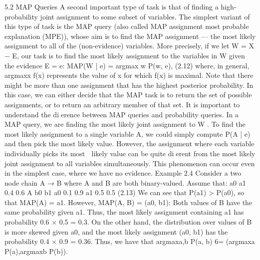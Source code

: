 5.2 MAP Queries
A second important type of task is that of finding a high-probability joint assignment to some subset of variables. The simplest variant of this type of task is the MAP query (also called MAP assignment most probable explanation (MPE)), whose aim is to find the MAP assignment — the most likely assignment to all of the (non-evidence) variables. More precisely, if we let W = X − E, our task is to find the most likely assignment to the variables in W given the evidence E = e: MAP(W | e) = argmax w P(w, e), (2.12) where, in general, argmaxx f(x) represents the value of x for which f(x) is maximal. Note that there might be more than one assignment that has the highest posterior probability. In this case, we can either decide that the MAP task is to return the set of possible assignments, or to return an arbitrary member of that set. It is important to understand the dierence between MAP queries and probability queries. In a MAP query, we are finding the most likely joint assignment to W . To find the most likely assignment to a single variable A, we could simply compute P(A | e) and then pick the most likely value. However, the assignment where each variable individually picks its most  likely value can be quite dierent from the most likely joint assignment to all variables simultaneously. This phenomenon can occur even in the simplest case, where we have no evidence. Example 2.4 Consider a two node chain A → B where A and B are both binary-valued. Assume that: a0 a1 0.4 0.6 A b0 b1 a0 0.1 0.9 a1 0.5 0.5 (2.13) We can see that P(a1) > P(a0), so that MAP(A) = a1. However, MAP(A, B) = (a0, b1): Both values of B have the same probability given a1. Thus, the most likely assignment containing a1 has probability 0.6 × 0.5 = 0.3. On the other hand, the distribution over values of B is more skewed given a0, and the most likely assignment (a0, b1) has the probability 0.4 × 0.9 = 0.36. Thus, we have that argmaxa,b P(a, b) 6= (argmaxa P(a),argmaxb P(b)).

